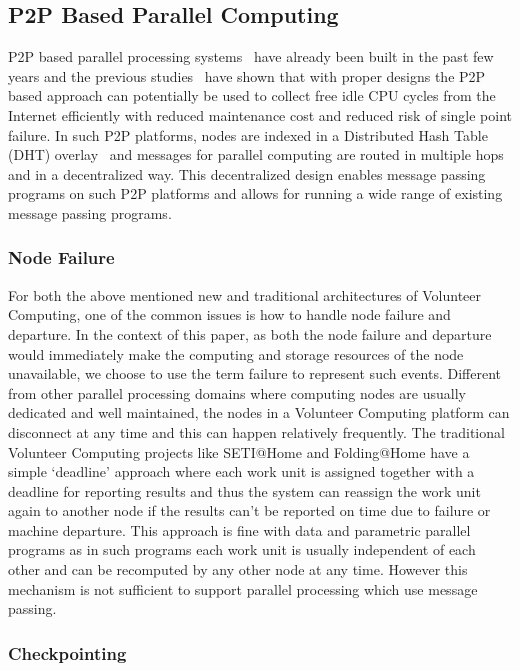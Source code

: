 \documentclass[times, 12pt, onecolumn]{article}
\begin{document}
\subsection{P2P Based Parallel Computing}
 
P2P based parallel processing systems~\cite{mpichopen, dvm, p2pmpi} have already been built in the past
few years and the previous studies~\cite{dvm} have shown that with proper designs the P2P based approach can 
potentially be used to collect free idle CPU cycles from the Internet efficiently with reduced maintenance cost
and reduced risk of single point failure. In such P2P platforms, nodes are indexed in a Distributed Hash Table 
(DHT) overlay~\cite{chord, mspastry, kademlia} and messages for parallel computing are routed in multiple hops 
and in a decentralized way. This decentralized design enables message passing programs on such P2P platforms and 
allows for running a wide range of existing message passing programs. 

\subsubsection{Node Failure}
For both the above mentioned new and traditional architectures of Volunteer Computing, one of the common issues 
is how to handle node failure and departure. In the context of this paper, as both the node failure and departure
would immediately make the computing and storage resources of the node unavailable, we choose to use the term 
failure to represent such events. Different from other parallel processing domains where computing nodes are 
usually dedicated and well maintained, the nodes in a Volunteer Computing platform can disconnect at any time 
and this can happen relatively frequently. The traditional Volunteer Computing projects like SETI@Home and Folding@Home have a 
simple `deadline' approach where each work unit is assigned together with a deadline for reporting results 
and thus the system can reassign the work unit again to another node if the results can't be reported on time due 
to failure or machine departure. This approach is fine with data and parametric parallel programs as in such 
programs each work unit is usually independent of each other and can be recomputed by any other node at 
any time. However this mechanism is not sufficient to support parallel processing which use message passing.

\subsubsection{Checkpointing}
\end{document}
